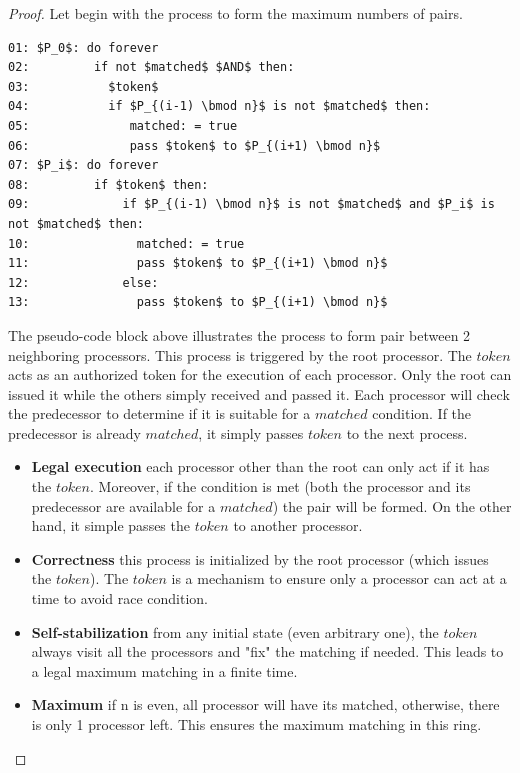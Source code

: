 \documentclass[12pt]{article}
\begin{document}
\bigskip

\begin{proof}

Let begin with the process to form the maximum numbers of pairs.

\begin{lstlisting}
01: $P_0$: do forever
02:         if not $matched$ $AND$ then:
03:           $token$
04:           if $P_{(i-1) \bmod n}$ is not $matched$ then:
05:              matched: = true
06:              pass $token$ to $P_{(i+1) \bmod n}$
07: $P_i$: do forever
08:         if $token$ then:
09:             if $P_{(i-1) \bmod n}$ is not $matched$ and $P_i$ is not $matched$ then:
10:               matched: = true
11:               pass $token$ to $P_{(i+1) \bmod n}$
12:             else:
13:               pass $token$ to $P_{(i+1) \bmod n}$
\end{lstlisting}

The pseudo-code block above illustrates the process to form pair between 2 neighboring processors. This process is
triggered by the root processor. The $token$ acts as an authorized token for the execution of each processor. Only 
the root can issued it while the others simply received and passed it. Each processor will check the predecessor to
determine if it is suitable for a $matched$ condition. If the predecessor is already $matched$, it simply passes 
$token$ to the next process.

\begin{itemize}
  \item \textbf{Legal execution} each processor other than the root can only act if it has the $token$. Moreover,
  if the condition is met (both the processor and its predecessor are available for a $matched$) the pair will be
  formed. On the other hand, it simple passes the $token$ to another processor.
  \item \textbf{Correctness} this process is initialized by the root processor (which issues the $token$). The $token$
  is a mechanism to ensure only a processor can act at a time to avoid race condition. 
  \item \textbf{Self-stabilization} from any initial state (even arbitrary one), the $token$ always visit all the processors
  and "fix" the matching if needed. This leads to a legal maximum matching in a finite time.
  \item \textbf{Maximum} if n is even, all processor will have its matched, otherwise, there is only 1 processor left. This
  ensures the maximum matching in this ring.
\end{itemize}
\end{proof}

\vspace{3in}
\end{document}
